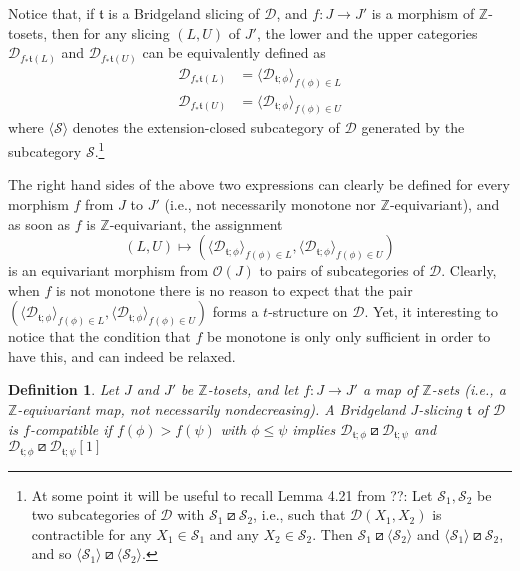 \documentclass{article}
\newtheorem{defn}[thm]{Definition}
\theoremstyle{definition}
\newcommand{\Z}{\mathbb{Z}}
\newcommand{\tee}{\mathfrak{t}}
\newcommand{\orth}{\boxslash}
\begin{document}
Notice that, if $\tee$ is a Bridgeland slicing of $\mathscr{D}$, and $f\colon J\to J'$ is a morphism of $\Z$-tosets, then for any slicing $(L,U)$ of $J'$, the lower and the upper categories
$\mathscr{D}_{f_*\tee(L)}$ and $\mathscr{D}_{f_*\tee(U)}$ can be equivalently defined as
\begin{align*}
\mathscr{D}_{f_*\tee(L)}&=\langle \mathscr{D}_{\tee;\phi}\rangle_{f(\phi)\in L}\\
\mathscr{D}_{f_*\tee(U)}&=\langle \mathscr{D}_{\tee;\phi}\rangle_{f(\phi)\in U}
\end{align*}
where $\langle \mathscr{S}\rangle$ denotes the extension-closed subcategory of $\mathscr{D}$ generated by the subcategory $\mathscr{S}$.\footnote{
At some point it will be useful to recall Lemma 4.21 from ??:
Let $\mathscr{S}_1,\mathscr{S}_2$ be two subcategories of $\mathscr{D}$ with $\mathscr{S}_1\orth \mathscr{S}_2$, i.e., such that $\mathscr{D}(X_1,X_2)$ is contractible for any $X_1\in \mathscr{S}_1$ and any $X_2\in\mathscr{S}_2$. Then $\mathscr{S}_1\orth \langle\mathscr{S}_2\rangle$ and $\langle\mathscr{S}_1\rangle\orth \mathscr{S}_2$, and so $\langle\mathscr{S}_1\rangle\orth \langle\mathscr{S}_2\rangle$.}

The right hand sides of the above two expressions can clearly be defined for every morphism $f$ from $J$ to $J'$ (i.e., not necessarily monotone nor $\Z$-equivariant), and as soon as $f$ is $\Z$-equivariant, the assignment
\[
(L,U)\mapsto (\langle \mathscr{D}_{\tee;\phi}\rangle_{f(\phi)\in L},\langle \mathscr{D}_{\tee;\phi}\rangle_{f(\phi)\in U})
\]
is an equivariant morphism from $\mathcal{O}(J)$ to pairs of subcategories of $\mathscr{D}$. Clearly, when $f$ is not monotone there is no reason to expect that the pair $(\langle \mathscr{D}_{\tee;\phi}\rangle_{f(\phi)\in L},\langle \mathscr{D}_{\tee;\phi}\rangle_{f(\phi)\in U})$ forms a $t$-structure on $\mathscr{D}$. Yet, it interesting to notice that the condition that $f$ be monotone is only only sufficient in order to have this, and can indeed be relaxed.

\begin{defn}
Let $J$ and $J'$ be $\Z$-tosets, and let $f\colon J\to J'$ a map of $\Z$-sets (i.e., a $\Z$-equivariant map, not necessarily nondecreasing). A Bridgeland $J$-slicing $\tee$ of $\mathscr{D}$ is \emph{$f$-compatible}
if $f(\phi)>f(\psi)$ with $\phi\leq \psi$ implies $\mathscr{D}_{\tee; \phi}\orth \mathscr{D}_{\tee;\psi}$ and $\mathscr{D}_{\tee; \phi}\orth \mathscr{D}_{\tee;\psi}[1]$
\end{defn}
\end{document}

